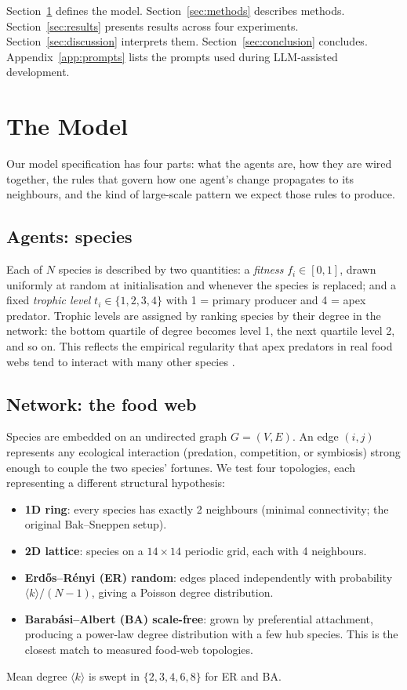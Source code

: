 \documentclass[11pt,a4paper]{article}
\begin{document}
Section~\ref{sec:model} defines the model. Section~\ref{sec:methods} describes methods. Section~\ref{sec:results} presents results across four experiments. Section~\ref{sec:discussion} interprets them. Section~\ref{sec:conclusion} concludes. Appendix~\ref{app:prompts} lists the prompts used during LLM-assisted development.

\section{The Model}\label{sec:model}
Our model specification has four parts: what the agents are, how they are wired together, the rules that govern how one agent's change propagates to its neighbours, and the kind of large-scale pattern we expect those rules to produce.

\subsection{Agents: species}
Each of $N$ species is described by two quantities: a \emph{fitness} $f_i \in [0,1]$, drawn uniformly at random at initialisation and whenever the species is replaced; and a fixed \emph{trophic level} $t_i \in \{1,2,3,4\}$ with 1 = primary producer and 4 = apex predator. Trophic levels are assigned by ranking species by their degree in the network: the bottom quartile of degree becomes level 1, the next quartile level 2, and so on. This reflects the empirical regularity that apex predators in real food webs tend to interact with many other species \citep{dunne2002foodweb}.

\subsection{Network: the food web}
Species are embedded on an undirected graph $G = (V,E)$. An edge $(i,j)$ represents any ecological interaction (predation, competition, or symbiosis) strong enough to couple the two species' fortunes. We test four topologies, each representing a different structural hypothesis:
\begin{itemize}
\item \textbf{1D ring}: every species has exactly 2 neighbours (minimal connectivity; the original Bak--Sneppen setup).
\item \textbf{2D lattice}: species on a $14 \times 14$ periodic grid, each with 4 neighbours.
\item \textbf{Erd\H{o}s--R\'enyi (ER) random}: edges placed independently with probability $\langle k \rangle / (N{-}1)$, giving a Poisson degree distribution.
\item \textbf{Barab\'asi--Albert (BA) scale-free}: grown by preferential attachment, producing a power-law degree distribution with a few hub species. This is the closest match to measured food-web topologies.
\end{itemize}
Mean degree $\langle k \rangle$ is swept in $\{2,3,4,6,8\}$ for ER and BA.
\end{document}
